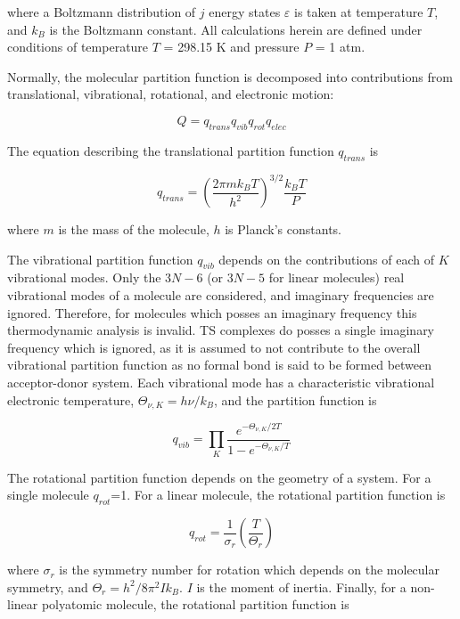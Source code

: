 \noindent where a Boltzmann distribution of $j$ energy states $\varepsilon$ is taken at temperature $T$, and $k_B$ is the Boltzmann constant. All calculations herein are defined under conditions of temperature $T$ = 298.15 K and pressure $P$ = 1 atm.

Normally, the molecular partition function is decomposed into contributions from translational, vibrational, rotational, and electronic motion:

\begin{equation}
  Q = q_{trans}q_{vib}q_{rot}q_{elec}
\end{equation}

\noindent The equation describing the translational partition function
$q_{trans}$ is

\begin{equation}
  q_{trans} = \left( \frac{2\pi m k_B T}{h^2} \right)^{3/2} \frac{k_BT}{P}
\end{equation}

\noindent where $m$ is the mass of the molecule, $h$ is Planck's constants.

The vibrational partition function $q_{vib}$ depends on the contributions of each of $K$ vibrational modes. Only the $3N-6$ (or $3N-5$ for linear molecules) real vibrational modes of a molecule are considered, and imaginary frequencies are ignored. Therefore, for molecules which posses an imaginary frequency this thermodynamic analysis is invalid. TS complexes do posses a single imaginary frequency which is ignored, as it is assumed to not contribute to the overall vibrational partition function as no formal bond is said to be formed between acceptor-donor system. Each vibrational mode has a characteristic vibrational electronic temperature, $\Theta_{\nu,K} = h\nu/k_B$, and the partition function is

\begin{equation}
  q_{vib} = \prod_K \frac{e^{-\Theta_{\nu,K}/2T}}{1 - e^{-\Theta_{\nu,K}/T}}
\end{equation}

The rotational partition function depends on the geometry of a system. For a single molecule $q_{rot}$=1. For a linear molecule, the rotational partition function is

\begin{equation}
  q_{rot} = \frac{1}{\sigma_r} \left(\frac{T}{\Theta_r}\right)
\end{equation}

\noindent where $\sigma_r$ is the symmetry number for rotation which depends on the molecular symmetry, and $\Theta_r = h^2/8\pi^2Ik_B$. $I$ is the moment of inertia. Finally, for a non-linear polyatomic molecule, the rotational partition function is

